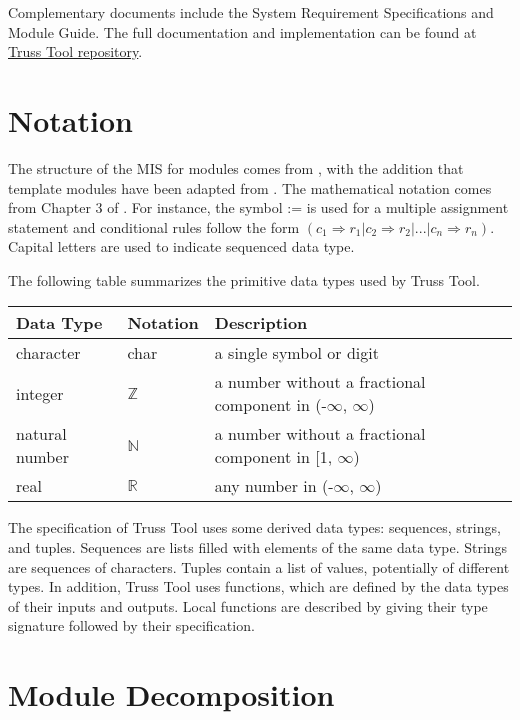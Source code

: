 \documentclass[12pt, titlepage]{article}
\begin{document}
Complementary documents include the System Requirement Specifications
and Module Guide.  The full documentation and implementation can be
found at \href{https://github.com/Maryamvalian/project741}{Truss Tool repository}.

\section{Notation}



The structure of the MIS for modules comes from \citet{HoffmanAndStrooper1995},
with the addition that template modules have been adapted from
\cite{GhezziEtAl2003}.  The mathematical notation comes from Chapter 3 of
\citet{HoffmanAndStrooper1995}.  For instance, the symbol := is used for a
multiple assignment statement and conditional rules follow the form $(c_1
\Rightarrow r_1 | c_2 \Rightarrow r_2 | ... | c_n \Rightarrow r_n )$.
Capital letters are used to indicate sequenced data type. 

The following table summarizes the primitive data types used by Truss Tool. 

\begin{center}
\renewcommand{\arraystretch}{1.2}
\noindent 
\begin{tabular}{l l p{7.5cm}} 
\toprule 
\textbf{Data Type} & \textbf{Notation} & \textbf{Description}\\ 
\midrule
character & char & a single symbol or digit\\
integer & $\mathbb{Z}$ & a number without a fractional component in (-$\infty$, $\infty$) \\
natural number & $\mathbb{N}$ & a number without a fractional component in [1, $\infty$) \\
real & $\mathbb{R}$ & any number in (-$\infty$, $\infty$)\\
\bottomrule
\end{tabular} 
\end{center}

\noindent
The specification of  Truss Tool uses some derived data types: sequences, strings, and
tuples. Sequences are lists filled with elements of the same data type. Strings
are sequences of characters. Tuples contain a list of values, potentially of
different types. In addition, Truss Tool uses functions, which
are defined by the data types of their inputs and outputs. Local functions are
described by giving their type signature followed by their specification.

\section{Module Decomposition}
\end{document}
